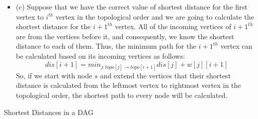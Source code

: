 \documentclass[12pt]{article}
\newenvironment{solution}[2][Solution]{\begin{trivlist}
\item[\hskip \labelsep {\bfseries #1}]}{\end{trivlist}}
\newenvironment{problem}[2][Problem]{\begin{trivlist}
\item[\hskip \labelsep {\bfseries #1}\hskip \labelsep {\bfseries #2.}]}{\end{trivlist}}
\begin{document}
\begin{solution}{}
\begin{itemize}
\item (c) Suppose that we have the correct value of shortest distance for the first vertex
to $i^{th}$ vertex in the topological order and we are going to calculate the shortest
distance for the $i+1^{th}$ vertex. All of the incoming vertices of $i+1^{th}$ are from
the vertices before it, and consequently, we know the shortest distance to each of them.
Thus, the minimum path for the $i+1^{th}$ vertex can be calculated based on its incoming
vertices as follows:
$$ dis[i+1] = min_{j : topo[j] \rightarrow topo[i+1]} {dis[j]+w[j][i+1]} $$
So, if we start with node $s$ and extend the vertices that their shortest distance is calculated
from the leftmost vertex to rightmost vertex in the topological order, the shortest path
to every node will be calculated.
\end{itemize}
\end{solution}

\begin{problem}{2}
Shortest Distances in a DAG
\end{problem}
\end{document}
